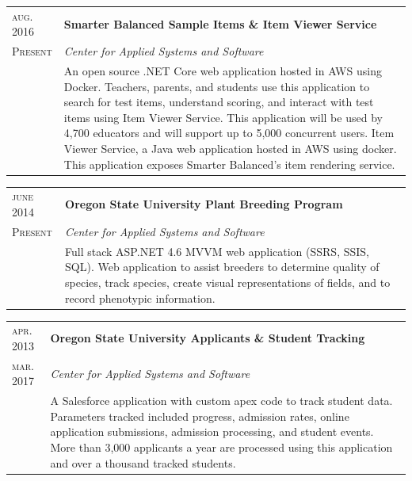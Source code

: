 \documentclass[10pt]{article}
\newenvironment{sectiontable}{ \begin{tabular}{p{16mm}|p{16cm}} }{ \end{tabular} }
\begin{document}
\begin{sectiontable}
{\small\textsc{aug. 2016}} 	& \textbf{Smarter Balanced Sample Items \& Item Viewer Service}\\
{\small\textsc{Present}}  & \emph{Center for Applied Systems and Software}\\
					& \rule{0pt}{2.3ex}\noindent    
An open source .NET Core web application hosted in AWS using Docker. \newline
Teachers, parents, and students use this application to search for test items, understand scoring, and interact with test items using Item Viewer Service. This application will be used by 4,700 educators and will support up to 5,000 concurrent users.
Item Viewer Service, a Java web application hosted in AWS using docker. This application exposes Smarter Balanced's item rendering service.
\end{sectiontable} 


\begin{sectiontable}
{\small\textsc{june 2014}} 	& \textbf{Oregon State University Plant Breeding Program}\\
{\small\textsc{Present}}  & \emph{Center for Applied Systems and Software}\\
					& \rule{0pt}{2.3ex}\noindent    
Full stack ASP.NET 4.6 MVVM web application (SSRS, SSIS, SQL). \newline
Web application to assist breeders to determine quality of species, track species, create visual representations of fields, and to record phenotypic information. 
\end{sectiontable} 

\begin{sectiontable}
{\small\textsc{apr. 2013}} 	& \textbf{Oregon State University Applicants \& Student Tracking}\\
{\small\textsc{mar. 2017}}  & \emph{Center for Applied Systems and Software}\\
					& \rule{0pt}{2.3ex}\noindent    
A Salesforce application with custom apex code to track student data. \newline 
Parameters tracked included progress, admission rates, online application submissions, admission processing, and student events. More than 3,000 applicants a year are processed using this application and over a thousand tracked students.
\end{sectiontable} 
\end{document}
